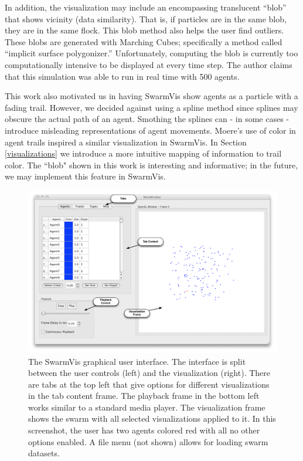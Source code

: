 \documentclass[conference]{IEEEtran}
\begin{document}
In addition, the visualization may include an encompassing translucent ``blob'' that shows vicinity (data similarity). That is, if particles are in the same blob, they are in the same flock. This blob method also helps the user find outliers.
These blobs are generated with Marching Cubes; specifically a method called ``implicit surface polygonizer.'' Unfortunately, computing the blob is currently too computationally intensive to be displayed at every time step.
The author claims that this simulation was able to run in real time with 500 agents.

This work also motivated us in having SwarmVis show agents as a particle with a fading trail.
However, we decided against using a spline method since splines may obscure the actual path of an agent. Smothing the splines can - in some cases - introduce misleading representations of agent movements.
Moere's use of color in agent trails inspired a similar visualization in SwarmVis. In Section \ref{visualizations} we introduce a more intuitive mapping of information to trail color.
The ``blob" shown in this work is interesting and informative; in the future, we may implement this feature in SwarmVis.


\begin{figure}[ht]
\centering
\includegraphics[scale=.45]{images/swarmvis-annotated.pdf}
\caption{The SwarmVis graphical user interface. 
The interface is split between the user controls (left) and the visualization (right). There are tabs at the top left that give
options for different visualizations in the tab content frame. The playback frame in the bottom left works similar to a
standard media player. The visualization frame shows the swarm with all selected visualizations applied to it. In this
screenshot, the user has two agents colored red with all no other options enabled. A file menu (not shown) allows for loading swarm datasets.}
\label{AnnotatedWindow}
\end{figure}
\end{document}
